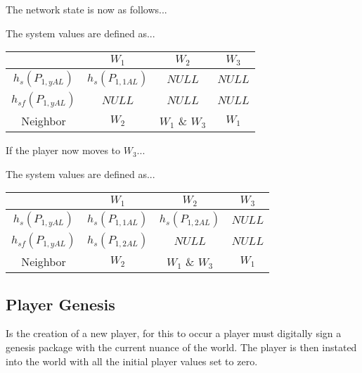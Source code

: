 \documentclass[runningheads,a4paper]{llncs}
\begin{document}
The network state is now as follows...

\begin{center}
\end{center}
The system values are defined as...
\begin{center}
\begin{tabular}{ c|c c c }
& $W_1$ & $W_2$ & $W_3$ \\
\hline 
$h_s(P_{1,yAL})$ & $ h_s(P_{1,1AL})$ & $NULL$ & $NULL$ \\ 
$h_{sf}(P_{1,yAL})$ & $NULL$ & $NULL$ & $NULL$ \\ 
Neighbor & $W_2$ & $W_1$ \& $W_3$ & $W_1$\\
\end{tabular}
\end{center}

If the player now moves to $W_3$...

\begin{center}
\end{center}
The system values are defined as...
\begin{center}
\begin{tabular}{ c|c c c }
& $W_1$ & $W_2$ & $W_3$ \\
\hline 
$h_s(P_{1,yAL})$ & $h_s(P_{1,1AL})$ & $h_s(P_{1,2AL})$ & $NULL$ \\ 
$h_{sf}(P_{1,yAL})$ & $h_s(P_{1,2AL})$ & $NULL$ & $NULL$ \\ 
Neighbor & $W_2$ & $W_1$ \& $W_3$ & $W_1$\\
\end{tabular}
\end{center}


\subsection{Player Genesis} Is the creation of a new player, for this to occur a player must digitally sign a genesis package with the current nuance of the world. The player is then instated into the world with all the initial player values set to zero. 
\end{document}
